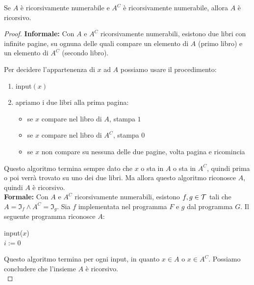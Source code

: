 \begin{theor}
	Se $A$ è ricorsivamente numerabile e $A^C$ è ricorsivamente numerabile, allora $A$ è ricorsivo.
\end{theor}
\begin{proof}
	\textbf{Informale:} Con $A$ e $A^C$ ricorsivamente numerabili, esistono due libri con infinite pagine, su ognuna delle quali compare un elemento di $A$ (primo libro) e un elemento di $A^C$ (secondo libro).

	Per decidere l'appartenenza di $x$ ad $A$ possiamo usare il procedimento:
	\begin{enumerate}
		\item input$(x)$
		\item apriamo i due libri alla prima pagina:
		\begin{itemize}
			\item se $x$ compare nel libro di $A$, stampa $1$
			\item se $x$ compare nel libro di $A^C$, stampa $0$
			\item se $x$ non compare su nessuna delle due pagine, volta pagina e ricomincia
		\end{itemize}
	\end{enumerate}

	Questo algoritmo termina sempre dato che $x$ o sta in $A$ o sta in $A^C$, quindi prima o poi verrà trovato su uno dei due libri. Ma allora questo algoritmo riconosce $A$, quindi $A$ è ricorsivo.\\

	\textbf{Formale:} Con $A$ e $A^C$ ricorsivamente numerabili, esistono $f,g \in \mathcal{T}$ tali che $A = \Im_f \wedge A^C = \Im_g$. Sia $f$ implementata nel programma $F$ e $g$ dal programma $G$. Il seguente programma riconosce $A$:
	\begin{center}
		\begin{minipage}{.5\textwidth}
			\begin{tcolorbox}[
				colback=white,
				sharp corners,
				boxrule=.3mm,
				left=20pt,
				top=0pt,
				bottom=0pt,
				colbacktitle=white,
				coltitle=black
				]
				\begin{algorithm}[H]
					input($x$) \\
					$i:=0$ \\
				\end{algorithm}
			\end{tcolorbox}
		\end{minipage}
	\end{center}

	Questo algoritmo termina per ogni input, in quanto $x \in A$ o $x \in A^C$. Possiamo concludere che l'insieme $A$ è ricorsivo. \\
\end{proof}

